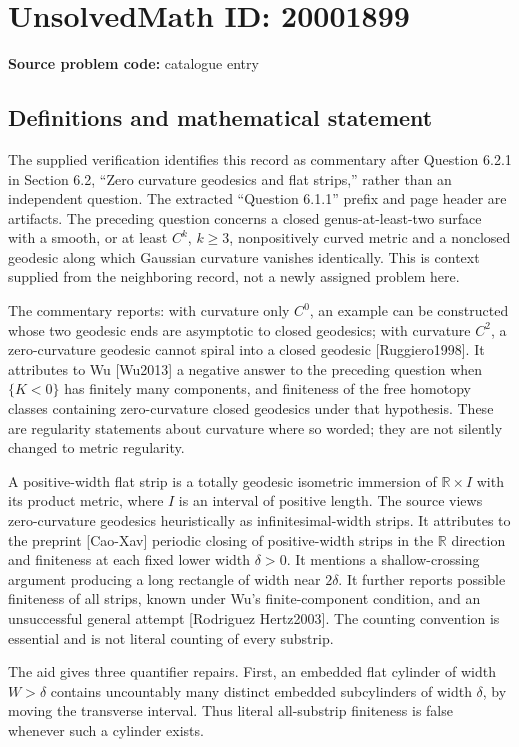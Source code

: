 \documentclass[11pt]{article}
\begin{document}
\section*{UnsolvedMath ID: 20001899}
\textbf{Source problem code:} catalogue entry
\subsection{Definitions and mathematical statement}
The supplied verification identifies this record as commentary after Question 6.2.1 in Section 6.2, ``Zero curvature geodesics and flat strips,'' rather than an independent question. The extracted ``Question 6.1.1'' prefix and page header are artifacts. The preceding question concerns a closed genus-at-least-two surface with a smooth, or at least \(C^k\), \(k\geq3\), nonpositively curved metric and a nonclosed geodesic along which Gaussian curvature vanishes identically. This is context supplied from the neighboring record, not a newly assigned problem here.

The commentary reports: with curvature only \(C^0\), an example can be constructed whose two geodesic ends are asymptotic to closed geodesics; with curvature \(C^2\), a zero-curvature geodesic cannot spiral into a closed geodesic [Ruggiero1998]. It attributes to Wu [Wu2013] a negative answer to the preceding question when \(\{K<0\}\) has finitely many components, and finiteness of the free homotopy classes containing zero-curvature closed geodesics under that hypothesis. These are regularity statements about curvature where so worded; they are not silently changed to metric regularity.

A positive-width flat strip is a totally geodesic isometric immersion of \(\mathbb R\times I\) with its product metric, where \(I\) is an interval of positive length. The source views zero-curvature geodesics heuristically as infinitesimal-width strips. It attributes to the preprint [Cao-Xav] periodic closing of positive-width strips in the \(\mathbb R\) direction and finiteness at each fixed lower width \(\delta>0\). It mentions a shallow-crossing argument producing a long rectangle of width near \(2\delta\). It further reports possible finiteness of all strips, known under Wu's finite-component condition, and an unsuccessful general attempt [Rodriguez Hertz2003]. The counting convention is essential and is not literal counting of every substrip.

The aid gives three quantifier repairs. First, an embedded flat cylinder of width \(W>\delta\) contains uncountably many distinct embedded subcylinders of width \(\delta\), by moving the transverse interval. Thus literal all-substrip finiteness is false whenever such a cylinder exists.
\end{document}
